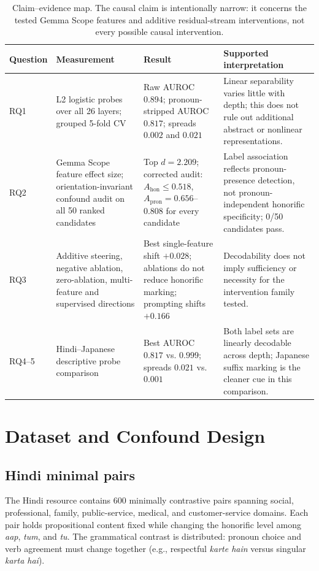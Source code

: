 \documentclass[10pt]{article}
\newcommand{\aap}{\textit{aap}}
\newcommand{\tum}{\textit{tum}}
\newcommand{\tu}{\textit{tu}}
\begin{document}
\begin{table}[H]
\centering
\small
\begin{tabularx}{\textwidth}{p{1.25cm}p{3.0cm}X X}
\toprule
\textbf{Question} & \textbf{Measurement} & \textbf{Result} & \textbf{Supported interpretation} \\
\midrule
RQ1 & L2 logistic probes over all 26 layers; grouped 5-fold CV &
Raw AUROC $0.894$; pronoun-stripped AUROC $0.817$; spreads $0.002$ and $0.021$ &
Linear separability varies little with depth; this does not rule out additional abstract or nonlinear representations. \\
RQ2 & Gemma Scope feature effect size; orientation-invariant confound audit on all 50 ranked candidates &
Top $d=2.209$; corrected audit: $A_{\mathrm{hon}}\leq0.518$, $A_{\mathrm{pron}}=0.656$--$0.808$ for every candidate &
Label association reflects pronoun-presence detection, not pronoun-independent honorific specificity; 0/50 candidates pass. \\
RQ3 & Additive steering, negative ablation, zero-ablation, multi-feature and supervised directions &
Best single-feature shift $+0.028$; ablations do not reduce honorific marking; prompting shifts $+0.166$ &
Decodability does not imply sufficiency or necessity for the intervention family tested. \\
RQ4--5 & Hindi--Japanese descriptive probe comparison &
Best AUROC $0.817$ vs. $0.999$; spreads $0.021$ vs. $0.001$ &
Both label sets are linearly decodable across depth; Japanese suffix marking is the cleaner cue in this comparison. \\
\bottomrule
\end{tabularx}
\caption{Claim--evidence map. The causal claim is intentionally narrow: it
concerns the tested Gemma Scope features and additive residual-stream
interventions, not every possible causal intervention.}
\label{tab:claim-map}
\end{table}
\FloatBarrier

\section{Dataset and Confound Design}

\subsection{Hindi minimal pairs}

The Hindi resource contains 600 minimally contrastive pairs spanning social,
professional, family, public-service, medical, and customer-service domains.
Each pair holds propositional content fixed while changing the honorific level
among \aap{}, \tum{}, and \tu{}. The grammatical contrast is distributed:
pronoun choice and verb agreement must change together (e.g., respectful
\textit{karte hain} versus singular \textit{karta hai}).
\end{document}
